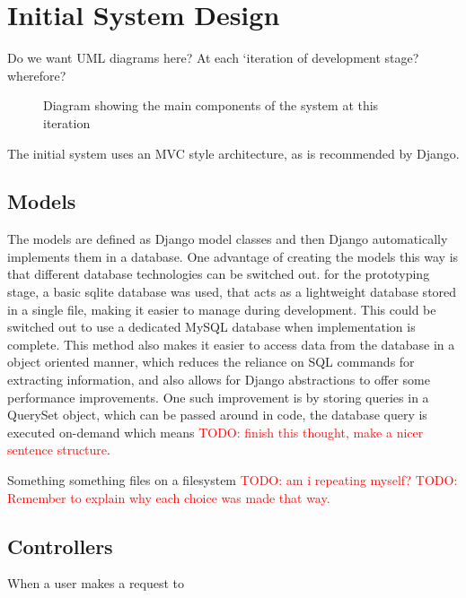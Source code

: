 \documentclass[a4paper,11pt]{report}
\newcommand{\todo}[1]{\textcolor{red}{TODO: #1}}
\begin{document}
\section{Initial System Design}
Do we want UML diagrams here? At each `iteration of development stage? wherefore?
\begin{figure}[ht]
\centering
{}
\caption{Diagram showing the main components of the system at this iteration}
\label{fig:i1sd}
\end{figure}
The initial system uses an MVC style architecture, as is recommended by Django.
\subsection{Models}
The models are defined as Django model classes and then Django automatically implements them in a database. One advantage of creating the models this way is that different database technologies can be switched out. for the prototyping stage, a basic sqlite database was used, that acts as a lightweight database stored in a single file, making it easier to manage during development. This could be switched out to use a dedicated MySQL database when implementation is complete. This method also makes it easier to access data from the database in a object oriented manner, which reduces the reliance on SQL commands for extracting information, and also allows for Django abstractions to offer some performance improvements. One such improvement is by storing queries in a QuerySet object, which can be passed around in code, the database query is executed on-demand which means \todo{finish this thought, make a nicer sentence structure}.\par
Something something files on a filesystem \todo{am i repeating myself?}
\todo{Remember to explain why each choice was made that way.}
\subsection{Controllers}
When a user makes a request to 
\end{document}
